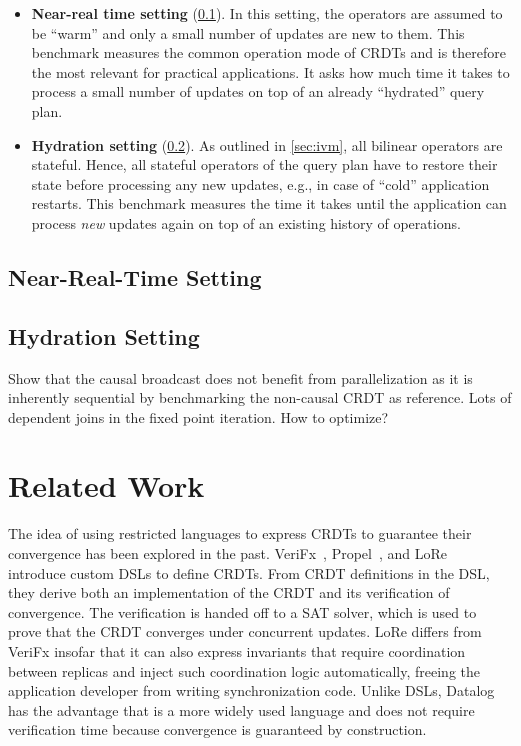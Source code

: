 \begin{itemize}
	\item \textbf{Near-real time setting} (\ref{sec:near-real-time-benchmark}).
	      In this setting, the operators are assumed to be ``warm'' and only
	      a small number of updates are new to them.
	      This benchmark measures the common operation mode of \acp{CRDT} and
	      is therefore the most relevant for practical applications. It asks
	      how much time it takes to process a small number of updates on top of
	      an already ``hydrated'' query plan.
	\item \textbf{Hydration setting} (\ref{sec:hydration-benchmark}).
	      As outlined in \ref{sec:ivm}, all bilinear operators are stateful.
	      Hence, all stateful operators of the query plan have to restore
	      their state before processing any new updates, e.g., in case of ``cold''
	      application restarts. This benchmark measures the time it takes
	      until the application can process \emph{new} updates again on top of
	      an existing history of operations.
\end{itemize}

\subsection{Near-Real-Time Setting}\label{sec:near-real-time-benchmark}

\subsection{Hydration Setting}\label{sec:hydration-benchmark}

Show that the causal broadcast does not benefit from parallelization
as it is inherently sequential by benchmarking the non-causal CRDT
as reference.
Lots of dependent joins in the fixed point iteration. How to optimize?

\section{Related Work}\label{sec:related-work}

The idea of using restricted languages to express \acp{CRDT} to guarantee
their convergence has been explored in the past.
VeriFx~\cite{verifx}, Propel~\cite{propel}, and LoRe~\cite{lore} introduce
custom \acp{DSL} to define \acp{CRDT}.
From \ac{CRDT} definitions in the \ac{DSL}, they derive both an implementation
of the \ac{CRDT} and its verification of convergence.
The verification is handed off to a \acs{SAT} solver, which is used to
prove that the \ac{CRDT} converges under concurrent updates.
LoRe differs from VeriFx insofar that it can also express invariants that
require coordination between replicas and inject such coordination logic
automatically, freeing the application developer from writing synchronization
code.
Unlike \acp{DSL}, Datalog has the advantage that is a more widely used language
and does not require verification time because convergence is guaranteed by
construction.

